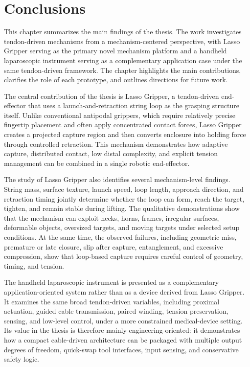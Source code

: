 \chapter{Conclusions} %
\label{Chapter11} %

This chapter summarizes the main findings of the thesis. The work investigates tendon-driven mechanisms from a mechanism-centered perspective, with Lasso Gripper serving as the primary novel mechanism platform and a handheld laparoscopic instrument serving as a complementary application case under the same tendon-driven framework. The chapter highlights the main contributions, clarifies the role of each prototype, and outlines directions for future work.

The central contribution of the thesis is Lasso Gripper, a tendon-driven end-effector that uses a launch-and-retraction string loop as the grasping structure itself. Unlike conventional antipodal grippers, which require relatively precise fingertip placement and often apply concentrated contact forces, Lasso Gripper creates a projected capture region and then converts enclosure into holding force through controlled retraction. This mechanism demonstrates how adaptive capture, distributed contact, low distal complexity, and explicit tension management can be combined in a single robotic end-effector.

The study of Lasso Gripper also identifies several mechanism-level findings. String mass, surface texture, launch speed, loop length, approach direction, and retraction timing jointly determine whether the loop can form, reach the target, tighten, and remain stable during lifting. The qualitative demonstrations show that the mechanism can exploit necks, horns, frames, irregular surfaces, deformable objects, oversized targets, and moving targets under selected setup conditions. At the same time, the observed failures, including geometric miss, premature or late closure, slip after capture, entanglement, and excessive compression, show that loop-based capture requires careful control of geometry, timing, and tension.

The handheld laparoscopic instrument is presented as a complementary application-oriented system rather than as a device derived from Lasso Gripper. It examines the same broad tendon-driven variables, including proximal actuation, guided cable transmission, paired winding, tension preservation, sensing, and low-level control, under a more constrained medical-device setting. Its value in the thesis is therefore mainly engineering-oriented: it demonstrates how a compact cable-driven architecture can be packaged with multiple output degrees of freedom, quick-swap tool interfaces, input sensing, and conservative safety logic.

